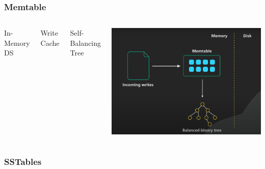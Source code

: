 \documentclass[
	11pt, 
]{beamer}
\begin{document}
\begin{frame}
    \frametitle{Memtable}
    \begin{columns}
            \begin{tcolorbox}[colback=white, colframe=blue!50!black, arc=4mm]
                In-Memory DS
            \end{tcolorbox}
            \begin{tcolorbox}[colback=white, colframe=blue!50!black, arc=4mm]
                Write Cache
            \end{tcolorbox}
            \begin{tcolorbox}[colback=white, colframe=blue!50!black, arc=4mm]
                Self-Balancing Tree
            \end{tcolorbox}
             \includegraphics[scale=0.22]{Memtable.png}
    \end{columns}
    
\end{frame}

\subsubsection{SSTables}
\end{document}
